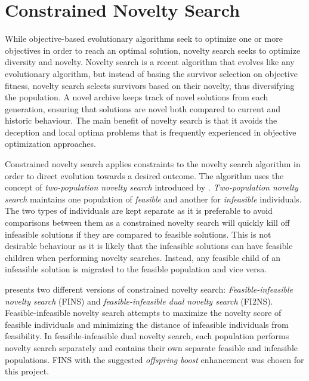 \section{Constrained Novelty Search}
\label{methodology_csn}
While objective-based evolutionary algorithms seek to optimize one or more objectives in order to reach an optimal solution, novelty search seeks to optimize diversity and novelty. Novelty search is a recent algorithm that evolves like any evolutionary algorithm, but instead of basing the survivor selection on objective fitness, novelty search selects survivors based on their novelty, thus diversifying the population\cite{liapis2014constrained}. A novel archive keeps track of novel solutions from each generation, ensuring that solutions are novel both compared to current and historic behaviour. The main benefit of novelty search is that it avoids the deception and local optima problems that is frequently experienced in objective optimization approaches\cite{lehman2011abandoning}.

Constrained novelty search applies constraints to the novelty search algorithm in order to direct evolution towards a desired outcome\cite{liapis2014constrained}. The algorithm uses the concept of \textit{two-population novelty search} introduced by \citet{lehman2010revising}. \textit{Two-population novelty search} maintains one population of \textit{feasible} and another for \textit{infeasible} individuals. 
The two types of individuals are kept separate as it is preferable to avoid comparisons between them\cite{liapis2014constrained} as a constrained novelty search will quickly kill off infeasible solutions if they are compared to feasible solutions. This is not desirable behaviour as it is likely that the infeasible solutions can have feasible children when performing novelty searches. Instead, any feasible child of an infeasible solution is migrated to the feasible population and vice versa. 

\citet{liapis2014constrained} presents two different versions of constrained novelty search: \textit{Feasible-infeasible novelty search} (FINS) and \textit{feasible-infeasible dual novelty search} (FI2NS). Feasible-infeasible novelty search attempts to maximize the novelty score of feasible individuals and minimizing the distance of infeasible individuals from feasibility. In feasible-infeasible dual novelty search, each population performs novelty search separately and contains their own separate feasible and infeasible populations. FINS with the suggested \textit{offspring boost} enhancement was chosen for this project.

